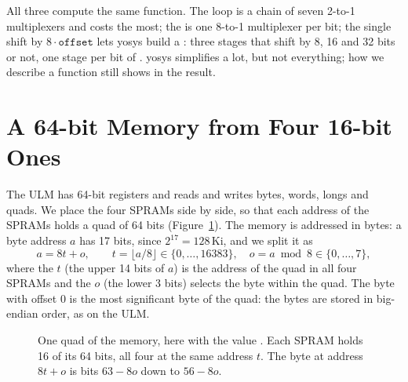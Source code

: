 
All three compute the same function. The loop is a chain of seven 2-to-1
multiplexers and costs the most; the  is one 8-to-1 multiplexer per
bit; the single shift by $8 \cdot \mathtt{offset}$ lets yosys build a
: three stages that shift by 8, 16 and 32 bits or not,
one stage per bit of . yosys simplifies a lot, but not everything;
how we describe a function still shows in the result.

\section{A 64-bit Memory from Four 16-bit Ones}
\label{sec:step08-ram}

The ULM has 64-bit registers and reads and writes bytes, words, longs and
quads. We place the four SPRAMs side by side, so that each address of the
SPRAMs holds a quad of 64 bits (Figure~\ref{fig:step08-layout}). The memory is
addressed in bytes: a byte address $a$ has 17 bits, since $2^{17} = 128$\,Ki,
and we split it as
\[
  a = 8t + o, \qquad t = \lfloor a/8 \rfloor \in \{0,\dots,16383\}, \quad
  o = a \bmod 8 \in \{0,\dots,7\},
\]
where the  $t$ (the upper 14 bits of $a$) is the address of the quad
in all four SPRAMs and the  $o$ (the lower 3 bits) selects the
byte within the quad. The byte with offset 0 is the most significant byte of
the quad: the bytes are stored in big-endian order, as on the ULM.

\begin{figure}[ht]
\centering
{}
\caption{One quad of the memory, here with the value .
Each SPRAM holds 16 of its 64 bits, all four at the same address $t$. The byte
at address $8t+o$ is bits $63-8o$ down to $56-8o$.}
\label{fig:step08-layout}
\end{figure}


